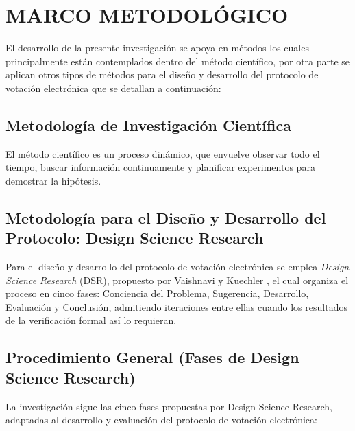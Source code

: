 \section{MARCO METODOLÓGICO}
El desarrollo de la presente investigación se apoya en métodos los cuales principalmente están contemplados dentro del método científico, por otra parte se aplican otros tipos de métodos para el diseño y desarrollo del protocolo de votación electrónica que se detallan a continuación:

\subsection{Metodología de Investigación Científica}
El método científico es un proceso dinámico, que envuelve observar todo el tiempo, buscar información continuamente y planificar experimentos para demostrar la hipótesis.

\subsection{Metodología para el Diseño y Desarrollo del Protocolo: Design Science Research}
Para el diseño y desarrollo del protocolo de votación electrónica se emplea \textit{Design Science Research} (DSR), propuesto por Vaishnavi y Kuechler \cite{Vaishnavi2004}, el cual organiza el proceso en cinco fases: Conciencia del Problema, Sugerencia, Desarrollo, Evaluación y Conclusión, admitiendo iteraciones entre ellas cuando los resultados de la verificación formal así lo requieran.

\subsection{Procedimiento General (Fases de Design Science Research)}
La investigación sigue las cinco fases propuestas por Design Science Research, adaptadas al desarrollo y evaluación del protocolo de votación electrónica:


